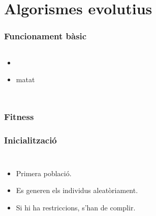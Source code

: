 \documentclass{beamer}
\begin{document}
\section{Algorismes evolutius} %
\label{sec:Algorismes evolutius}

\begin{frame}
	\frametitle{Funcionament bàsic}
	\begin{columns}[c]
		\begin{itemize}
			\item 
				\pause
			\item matat
		\end{itemize}
	\end{columns}
\end{frame}

\begin{frame}
	\frametitle{Fitness}
\end{frame}


\begin{frame}
	\frametitle{Inicialització}
	\begin{columns}[c]
		\begin{itemize}
			\item Primera població.
			\item Es generen els individus aleatòriament.
			\item Si hi ha restriccions, s'han de complir.
		\end{itemize}
	\end{columns}
\end{frame}
\end{document}
